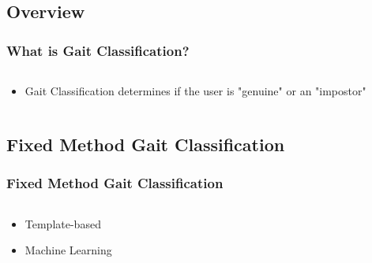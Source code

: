 \documentclass{beamer}
\begin{document}
\subsection{Overview}
\begin{frame}
\frametitle{What is Gait Classification?}
 \begin{columns}
  \begin{column}{.9\textwidth}
  \begin{itemize}
  		\item Gait Classification determines if the user is "genuine" or an "impostor"
  \end{itemize}
  \end{column}
  \begin{column}{0.7\textwidth}
       \\
  \end{column}
  \end{columns}  
\end{frame}

\subsection{Fixed Method Gait Classification}
\begin{frame}
\frametitle{Fixed Method Gait Classification}
 \begin{columns}
  \begin{column}{.7\textwidth}
  \begin{itemize}
				\item Template-based 
				\linebreak
				\item Machine Learning 
			
  \end{itemize}
  \end{column}
  \begin{column}{0.4\textwidth}
       \\
  \end{column}
  \end{columns}  
  
\end{frame}
\end{document}
